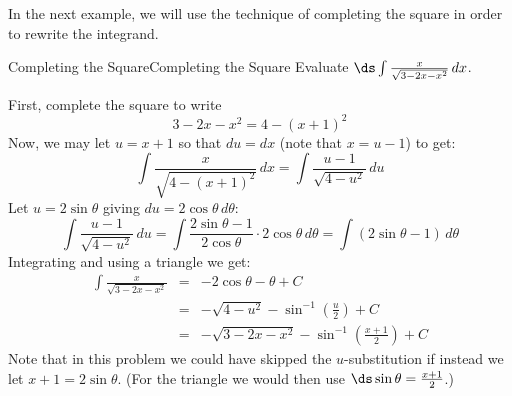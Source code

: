 In the next example, we will use the technique of completing the square in order to rewrite the integrand.

\begin{example}{Completing the Square}{Completing the Square}
Evaluate $\ds\int\frac{x}{\sqrt{3-2x-x^2}}\,dx$.
\end{example}  

\begin{solution}
First, complete the square to write 
$$3-2x-x^2=4-(x+1)^2$$ 
Now, we may let $u=x+1$ so that $du=dx$ (note that $x=u-1$) to get:
$$\int\frac{x}{\sqrt{4-(x+1)^2}}\,dx=\int\frac{u-1}{\sqrt{4-u^2}}\,du$$ 
Let $u=2\sin\theta$ giving $du=2\cos\theta\,d\theta$: 
$$\int\frac{u-1}{\sqrt{4-u^2}}\,du = \int\frac{2\sin\theta-1}{2\cos\theta}\cdot 2\cos\theta\,d\theta=\int (2\sin\theta-1)\,d\theta$$
Integrating and using a triangle we get:
\begin{eqnarray*}
\int\frac{x}{\sqrt{3-2x-x^2}}	& = &-2\cos\theta-\theta+C  \\
	& = &-\sqrt{4-u^2}-\sin^{-1}\left(\frac{u}{2}\right)+C  \\
	& = &-\sqrt{3-2x-x^2}-\sin^{-1}\left(\frac{x+1}{2}\right)+C 
\end{eqnarray*}
Note that in this problem we could have skipped the $u$-substitution if instead we let $x+1=2\sin\theta$. (For the  triangle we would then use $\ds\sin\theta=\frac{x+1}{2}$.)
\end{solution}


